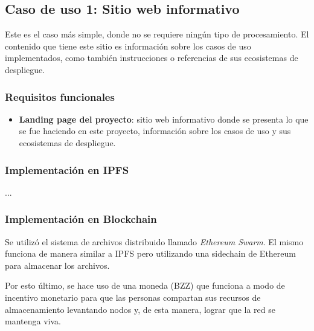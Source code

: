 \subsection{Caso de uso 1: Sitio web informativo}

Este es el caso más simple, donde no se requiere ningún tipo de procesamiento. El contenido que tiene este sitio es información sobre los casos de uso implementados, como también instrucciones o referencias de sus ecosistemas de despliegue. 

\subsubsection{Requisitos funcionales}

\begin{itemize}
    \item \textbf{Landing page del proyecto}: sitio web informativo donde se presenta lo que se fue haciendo en este proyecto, información sobre los casos de uso y sus ecosistemas de despliegue.
\end{itemize}

\subsubsection{Implementación en IPFS}

...

\subsubsection{Implementación en Blockchain}

Se utilizó el sistema de archivos distribuido llamado \textit{Ethereum Swarm}\cite{ethereum-swarm}. El mismo funciona de manera similar a IPFS pero utilizando una sidechain de Ethereum para almacenar los archivos.

Por esto último, se hace uso de una moneda (BZZ) que funciona a modo de incentivo monetario para que las personas compartan sus recursos de almacenamiento levantando nodos y, de esta manera, lograr que la red se mantenga viva.